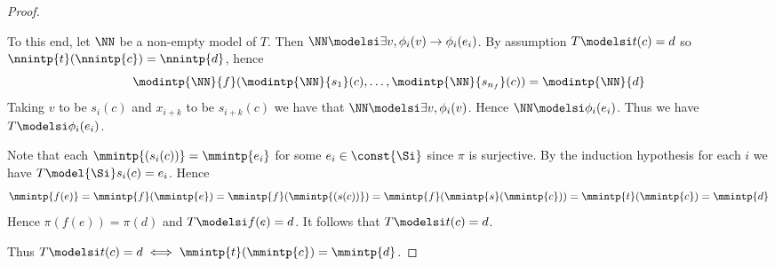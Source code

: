 \begin{proof}
\begin{itemize}
\begin{forward}
            To this end, let $\NN$ be a non-empty model of $T$.
            Then $\NN \modelsi \exists v, \phi_i(v) \to \phi_i(e_i)$.
            By assumption $T \modelsi t(c) = d$ so 
            $\nnintp{t}(\nnintp{c}) = \nnintp{d}$,
            hence 
            \[
                \modintp{\NN}{f}(
                    \modintp{\NN}{s_1}(c),\dots,\modintp{\NN}{s_{n_f}}(c)) = 
                \modintp{\NN}{d}
            \]
            Taking $v$ to be $s_i(c)$ and $x_{i+k}$ to be $s_{i+k}(c)$
            we have that 
            $\NN \modelsi \exists v, \phi_i(v)$.
            Hence $\NN \modelsi \phi_i(e_i)$.
            Thus we have $T \modelsi \phi_i(e_i)$.
        \end{forward}

        \begin{backward} 
            Note that each $\mmintp{(s_i(c))} = \mmintp{e_i}$ 
            for some $e_i \in \const{\Si}$ 
            since $\pi$ is surjective.
            By the induction hypothesis for each $i$ we have 
            $T \model{\Si} s_i(c) = e_i$.
            Hence 
            \[
                \mmintp{f(e)}
                = \mmintp{f}(\mmintp{e}) = \mmintp{f}(\mmintp{(s(c))}) 
                = \mmintp{f}(\mmintp{s}(\mmintp{c})) 
                = \mmintp{t}(\mmintp{c}) = \mmintp{d}
            \]
            Hence $\pi(f(e)) = \pi(d)$ and 
            $T \modelsi f(e) = d$.
            It follows that 
            $T \modelsi t(c) = d$.
        \end{backward}
    \end{itemize}
    Thus $T \modelsi t(c) = d \iff \mmintp{t}(\mmintp{c}) = \mmintp{d}$.


\end{proof}
